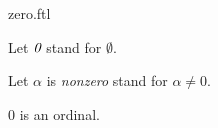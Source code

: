 \documentclass{naproche-library}
\begin{document}
\begin{smodule}[title=The number $0$]{zero.ftl}

\begin{forthel}
  Let $\emph{0}$ stand for $\emptyset$.

  Let $\alpha$ is \emph{nonzero} stand for $\alpha \neq 0$.
\end{forthel}

\begin{proposition}[forthel,id=SET_THEORY_02_8483196888940544]
  $0$ is an ordinal.
\end{proposition}
\end{smodule}
\end{document}
